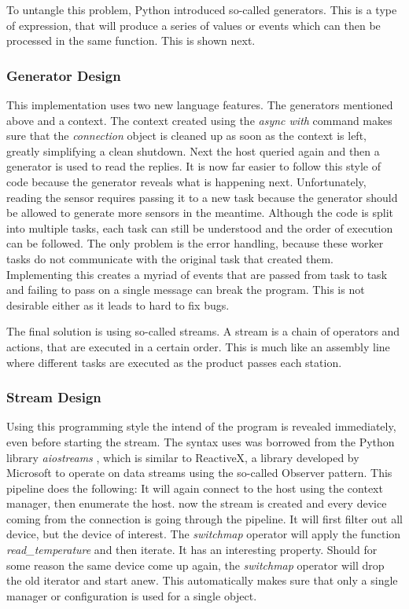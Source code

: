To untangle this problem, Python introduced so-called generators. This is a type of expression, that will produce a series of values or events which can then be processed in the same function. This is shown next.

\subsubsection{Generator Design}


This implementation uses two new language features. The generators mentioned above and a context. The context created using the \textit{async with} command makes sure that the \textit{connection} object is cleaned up as soon as the context is left, greatly simplifying a clean shutdown. Next the host queried again and then a generator is used to read the replies. It is now far easier to follow this style of code because the generator reveals what is happening next. Unfortunately, reading the sensor requires passing it to a new task because the generator should be allowed to generate more sensors in the meantime. Although the code is split into multiple tasks, each task can still be understood and the order of execution can be followed. The only problem is the error handling, because these worker tasks do not communicate with the original task that created them. Implementing this creates a myriad of events that are passed from task to task and failing to pass on a single message can break the program. This is not desirable either as it leads to hard to fix bugs.

The final solution is using so-called streams. A stream is a chain of operators and actions, that are executed in a certain order. This is much like an assembly line where different tasks are executed as the product passes each station.

\subsubsection{Stream Design}


Using this programming style the intend of the program is revealed immediately, even before starting the stream. The syntax uses was borrowed from the Python library \textit{aiostreams} \cite{aiostreams}, which is similar to ReactiveX, a library developed by Microsoft to operate on data streams using the so-called Observer pattern. This pipeline does the following: It will again connect to the host using the context manager, then enumerate the host. now the stream is created and every device coming from the connection is going through the pipeline. It will first filter out all device, but the device of interest. The \textit{switchmap} operator will apply the function \textit{read\_temperature} and then iterate. It has an interesting property. Should for some reason the same device come up again, the \textit{switchmap} operator will drop the old iterator and start anew. This automatically makes sure that only a single manager or configuration is used for a single object.

